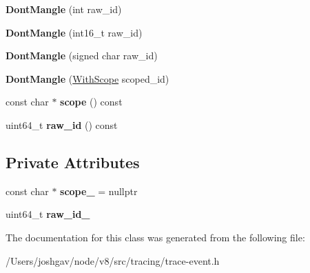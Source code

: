 \begin{DoxyCompactItemize}
\item 
{\bfseries Dont\+Mangle} (int raw\+\_\+id)\hypertarget{classv8_1_1internal_1_1tracing_1_1_trace_i_d_1_1_dont_mangle_a08700d6842ccae690f22f42f067dd2d3}{}\label{classv8_1_1internal_1_1tracing_1_1_trace_i_d_1_1_dont_mangle_a08700d6842ccae690f22f42f067dd2d3}

\item 
{\bfseries Dont\+Mangle} (int16\+\_\+t raw\+\_\+id)\hypertarget{classv8_1_1internal_1_1tracing_1_1_trace_i_d_1_1_dont_mangle_a8b0e6cc46f03f8de6dcf67057a88f377}{}\label{classv8_1_1internal_1_1tracing_1_1_trace_i_d_1_1_dont_mangle_a8b0e6cc46f03f8de6dcf67057a88f377}

\item 
{\bfseries Dont\+Mangle} (signed char raw\+\_\+id)\hypertarget{classv8_1_1internal_1_1tracing_1_1_trace_i_d_1_1_dont_mangle_a2ed02b5d1076c2e470bf1d43826695c6}{}\label{classv8_1_1internal_1_1tracing_1_1_trace_i_d_1_1_dont_mangle_a2ed02b5d1076c2e470bf1d43826695c6}

\item 
{\bfseries Dont\+Mangle} (\hyperlink{classv8_1_1internal_1_1tracing_1_1_trace_i_d_1_1_with_scope}{With\+Scope} scoped\+\_\+id)\hypertarget{classv8_1_1internal_1_1tracing_1_1_trace_i_d_1_1_dont_mangle_a13bc1d06b3a9260d0c0d258ade0ec812}{}\label{classv8_1_1internal_1_1tracing_1_1_trace_i_d_1_1_dont_mangle_a13bc1d06b3a9260d0c0d258ade0ec812}

\item 
const char $\ast$ {\bfseries scope} () const \hypertarget{classv8_1_1internal_1_1tracing_1_1_trace_i_d_1_1_dont_mangle_a15c56e1a4db105e9f6bb03e18ee6d6d0}{}\label{classv8_1_1internal_1_1tracing_1_1_trace_i_d_1_1_dont_mangle_a15c56e1a4db105e9f6bb03e18ee6d6d0}

\item 
uint64\+\_\+t {\bfseries raw\+\_\+id} () const \hypertarget{classv8_1_1internal_1_1tracing_1_1_trace_i_d_1_1_dont_mangle_a2ee2c9b1a26bf44639d1d2439704e0a6}{}\label{classv8_1_1internal_1_1tracing_1_1_trace_i_d_1_1_dont_mangle_a2ee2c9b1a26bf44639d1d2439704e0a6}

\end{DoxyCompactItemize}
\subsection*{Private Attributes}
\begin{DoxyCompactItemize}
\item 
const char $\ast$ {\bfseries scope\+\_\+} = nullptr\hypertarget{classv8_1_1internal_1_1tracing_1_1_trace_i_d_1_1_dont_mangle_a963527c84f6d18e1f91a6d382c131292}{}\label{classv8_1_1internal_1_1tracing_1_1_trace_i_d_1_1_dont_mangle_a963527c84f6d18e1f91a6d382c131292}

\item 
uint64\+\_\+t {\bfseries raw\+\_\+id\+\_\+}\hypertarget{classv8_1_1internal_1_1tracing_1_1_trace_i_d_1_1_dont_mangle_a98b7f30fecc223377fd3ed8345ff05c3}{}\label{classv8_1_1internal_1_1tracing_1_1_trace_i_d_1_1_dont_mangle_a98b7f30fecc223377fd3ed8345ff05c3}

\end{DoxyCompactItemize}


The documentation for this class was generated from the following file\+:\begin{DoxyCompactItemize}
\item 
/\+Users/joshgav/node/v8/src/tracing/trace-\/event.\+h\end{DoxyCompactItemize}
